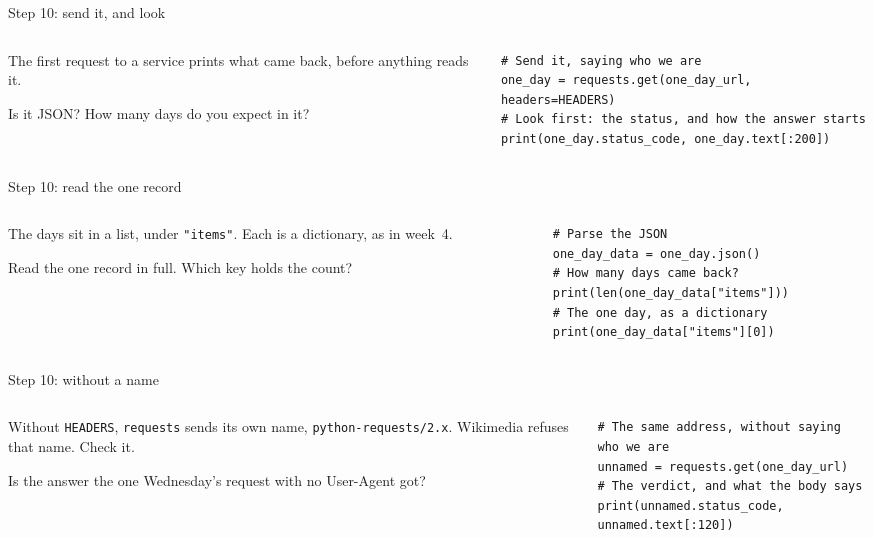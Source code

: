 \documentclass[9pt,aspectratio=169]{beamer}
\begin{document}
\begin{frame}[fragile]{Step 10: send it, and look}
    \begin{columns}[T]
        \begin{column}{0.37\textwidth}
            The first request to a service prints what came back, before anything reads it.

            \medskip
            Is it JSON? How many days do you expect in it?
        \end{column}
        \begin{column}{0.6\textwidth}
\begin{lstlisting}[style=lab]
# Send it, saying who we are
one_day = requests.get(one_day_url, headers=HEADERS)
# Look first: the status, and how the answer starts
print(one_day.status_code, one_day.text[:200])
\end{lstlisting}
        \end{column}
    \end{columns}
\end{frame}

\begin{frame}[fragile]{Step 10: read the one record}
    \begin{columns}[T]
        \begin{column}{0.37\textwidth}
            The days sit in a list, under \texttt{"items"}. Each is a dictionary, as in week~4.

            \medskip
            Read the one record in full. Which key holds the count?
        \end{column}
        \begin{column}{0.6\textwidth}
\begin{lstlisting}[style=lab]
# Parse the JSON
one_day_data = one_day.json()
# How many days came back?
print(len(one_day_data["items"]))
# The one day, as a dictionary
print(one_day_data["items"][0])
\end{lstlisting}
        \end{column}
    \end{columns}
\end{frame}

\begin{frame}[fragile]{Step 10: without a name}
    \begin{columns}[T]
        \begin{column}{0.37\textwidth}
            Without \texttt{HEADERS}, \texttt{requests} sends its own name, \texttt{python-requests/2.x}. Wikimedia refuses that name. Check it.

            \medskip
            Is the answer the one Wednesday's request with no User-Agent got?
        \end{column}
        \begin{column}{0.6\textwidth}
\begin{lstlisting}[style=lab]
# The same address, without saying who we are
unnamed = requests.get(one_day_url)
# The verdict, and what the body says
print(unnamed.status_code, unnamed.text[:120])
\end{lstlisting}
        \end{column}
    \end{columns}
\end{frame}
\end{document}
